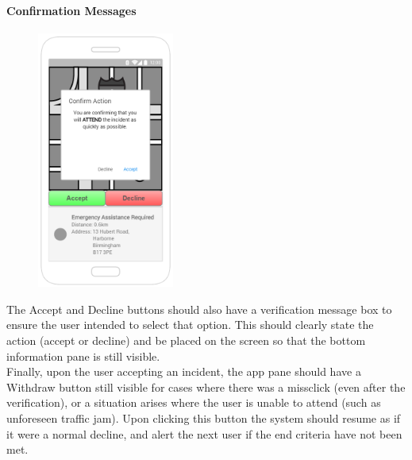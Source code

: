 \documentclass{article}
\begin{document}
\paragraph{Confirmation Messages}
\begin{figure}
  \begin{center}
  \vspace{-30pt}
    \includegraphics[width=0.4\textwidth]{"Iteration2/Iteration 1 - Accept_Decline Buttons 2"}
  \end{center}
  \vspace{-140pt}
\end{figure}
The Accept and Decline buttons should also have a verification message box to ensure the user intended to select that option. This should clearly state the action (accept or decline)  and  be placed on the screen so that the bottom information pane is still visible.\\

Finally, upon the user accepting an incident, the app pane should have a Withdraw button still visible for cases where there was a missclick (even after the verification), or a situation arises where the user is unable to attend (such as unforeseen traffic jam). Upon clicking this button the system should resume as if it were a normal decline, and alert the next user if the end criteria have not been met.
\pagebreak
\end{document}
